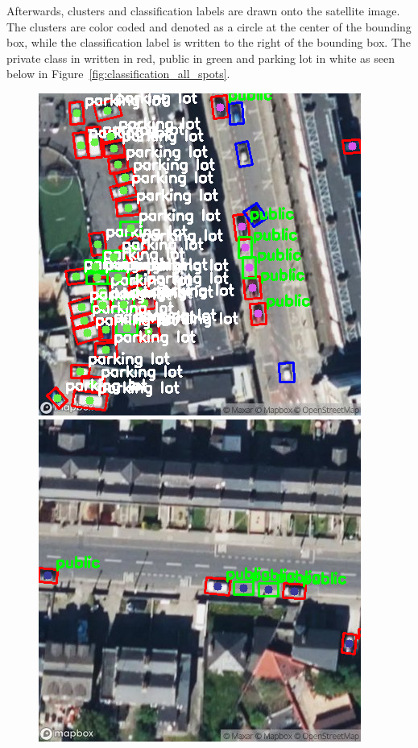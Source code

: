 Afterwards, clusters and classification labels are drawn onto the satellite image. The clusters are color coded and denoted as a circle at the center of the bounding box, while the classification label is written to the right of the bounding box. The private class in written in red, public in green and parking lot in white as seen below in Figure~\ref{fig:classification_all_spots}.

\begin{figure}[htbp]
  \centering
  \begin{minipage}{0.45\textwidth}
    \centering
    \includegraphics[width=\textwidth]{images/classification1.png}
  \end{minipage}
  \hfill
  \begin{minipage}{0.45\textwidth}
    \centering
    \includegraphics[width=\textwidth]{images/classification2.png}

\end{minipage}
\end{figure}
